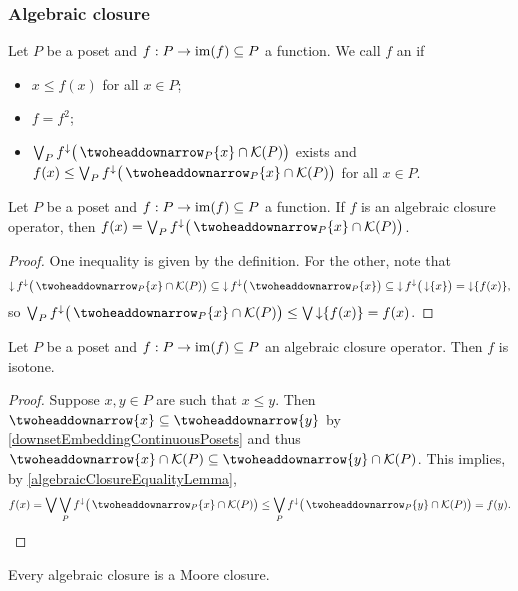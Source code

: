 \subsubsection{Algebraic closure}
\begin{definition}
Let $P$ be a poset and $f: P\to \operatorname{im}(f) \subseteq P$ a function. We call $f$ an  if
\begin{itemize}
\item $x \leq f(x)$ for all $x\in P$;
\item $f = f^2$;
\item $\bigvee_{P} f^\imf\big(\ddownset_P\{x\}\cap \compacts(P)\big)$ exists and $f(x) \leq \bigvee_{P} f^\imf\big(\ddownset_P\{x\}\cap \compacts(P)\big)$ for all $x\in P$.
\end{itemize}
\end{definition}

\begin{lemma} \label{algebraicClosureEqualityLemma}
Let $P$ be a poset and $f: P\to \operatorname{im}(f) \subseteq P$ a function.
If $f$ is an algebraic closure operator, then $f(x) = \bigvee_{P} f^\imf\big(\ddownset_P\{x\}\cap \compacts(P)\big)$.
\end{lemma}
\begin{proof}
One inequality is given by the definition. For the other, note that
\[ \downset f^\imf\big(\ddownset_P \{x\}\cap \compacts(P)\big) \subseteq \downset f^\imf\big(\ddownset_P \{x\}\big) \subseteq \downset f^\imf\big(\downset \{x\}\big) = \downset \{f(x)\}, \]
so $\bigvee_P f^\imf\big(\ddownset_P \{x\}\cap \compacts(P)\big) \leq \bigvee \downset\{f(x)\} = f(x)$.
\end{proof}

\begin{lemma} \label{algebraicClosureIsotone}
Let $P$ be a poset and $f: P\to \operatorname{im}(f) \subseteq P$ an algebraic closure operator. Then $f$ is isotone.
\end{lemma}
\begin{proof}
Suppose $x,y\in P$ are such that $x\leq y$. Then $\ddownset\{x\} \subseteq \ddownset\{y\}$ by \ref{downsetEmbeddingContinuousPosets} and thus $\ddownset \{x\}\cap \compacts(P) \subseteq \ddownset \{y\}\cap \compacts(P)$. This implies, by \ref{algebraicClosureEqualityLemma},
\[ f(x) = \bigvee \bigvee_{P} f^\imf\big(\ddownset_P\{x\}\cap \compacts(P)\big) \leq \bigvee_{P} f^\imf\big(\ddownset_P\{y\}\cap \compacts(P)\big) = f(y). \]
\end{proof}
\begin{corollary} \label{algebraicClosureMooreClosure}
Every algebraic closure is a Moore closure.
\end{corollary}

